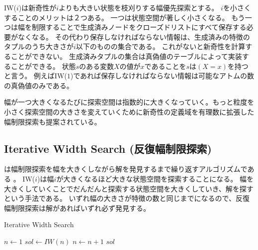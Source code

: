 
IW($i$)は新奇性が$i$よりも大きい状態を枝刈りする幅優先探索とする。
$i$を小さくすることのメリットは２つある。
一つは状態空間が著しく小さくなる。
もう一つは幅を制限することで生成済みノードをクローズドリストにすべて保存する必要がなくなる。
その代わり保存しなければならない情報は、生成済みの特徴のタプルのうち大きさが$i$以下のものの集合である。
これがないと新奇性を計算することができない。
生成済みタプルの集合は真偽値のテーブルによって実装することができる。
状態$s$のある変数$X$の値が$x$であることを$s$は$(X = x)$を持つと言う。
例えばIW($1$)であれば保存しなければならない情報は可能なアトムの数の真偽値のみである。

幅が一つ大きくなるたびに探索空間は指数的に大きくなっていく。もっと粒度を小さく探索空間の大きさを変えていくために新奇性の定義域を有理数に拡張した幅制限探索も提案されている\cite{geffner2015}。


\subsection{Iterative Width Search (反復幅制限探索)}
\label{sec:iterative-width-search}

は幅制限探索を幅を大きくしながら解を発見するまで繰り返すアルゴリズムである \cite{lipovetzkyg12}。
IW($i$)は幅$i$が大きくなるほど大きな状態空間を探索することになる。
幅を大きくしていくことでだんだんと探索する状態空間を大きくしていき、解を探すという手法である。
いずれ幅の大きさが特徴の数と同じまでになるので、反復幅制限探索は解があればいずれ必ず発見する。

\begin{algorithm}
\caption{Iterative Width Search}
	$n \leftarrow 1$
	 {
		$sol \leftarrow IW(n)$\;
		$n \leftarrow n + 1$\;
	}
	\Return $sol$
\end{algorithm}

